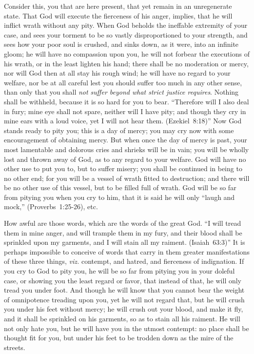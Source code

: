 \documentclass[
]{book}
\begin{document}
Consider this, you that are here present, that yet remain in an unregenerate state. That God will execute the fierceness of his anger, implies, that he will inflict wrath without any pity. When God beholds the ineffable extremity of your case, and sees your torment to be so vastly disproportioned to your strength, and sees how your poor soul is crushed, and sinks down, as it were, into an infinite gloom; he will have no compassion upon you, he will not forbear the executions of his wrath, or in the least lighten his hand; there shall be no moderation or mercy, nor will God then at all stay his rough wind; he will have no regard to your welfare, nor be at all careful lest you should suffer too much in any other sense, than only that you shall \emph{not suffer beyond what strict justice requires}. Nothing shall be withheld, because it is so hard for you to bear. ``Therefore will I also deal in fury; mine eye shall not spare, neither will I have pity; and though they cry in mine ears with a loud voice, yet I will not hear them. (Ezekiel~8:18)'' Now God stands ready to pity you; this is a day of mercy; you may cry now with some encouragement of obtaining mercy. But when once the day of mercy is past, your most lamentable and dolorous cries and shrieks will be in vain; you will be wholly lost and thrown away of God, as to any regard to your welfare. God will have no other use to put you to, but to suffer misery; you shall be continued in being to no other end; for you will be a vessel of wrath fitted to destruction; and there will be no other use of this vessel, but to be filled full of wrath. God will be so far from pitying you when you cry to him, that it is said he will only ``laugh and mock,'' (Proverbs~1:25-26), etc.

How awful are those words, which are the words of the great God. ``I will tread them in mine anger, and will trample them in my fury, and their blood shall be sprinkled upon my garments, and I will stain all my raiment. (Isaiah~63:3)'' It is perhaps impossible to conceive of words that carry in them greater manifestations of these three things, \emph{viz.} contempt, and hatred, and fierceness of indignation. If you cry to God to pity you, he will be so far from pitying you in your doleful case, or showing you the least regard or favor, that instead of that, he will only tread you under foot. And though he will know that you cannot bear the weight of omnipotence treading upon you, yet he will not regard that, but he will crush you under his feet without mercy; he will crush out your blood, and make it fly, and it shall be sprinkled on his garments, so as to stain all his raiment. He will not only hate you, but he will have you in the utmost contempt: no place shall be thought fit for you, but under his feet to be trodden down as the mire of the streets.
\end{document}

